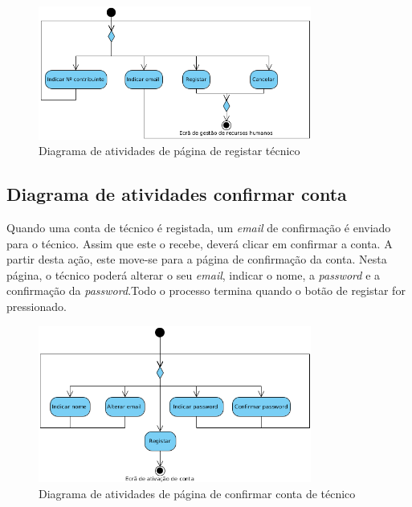 \begin{figure}[htb]
    \centering
    \includegraphics[width=0.8\textwidth]{images/diagramas/atividades/diagrama_atividades_add_professional.png}
    \caption{Diagrama de atividades de página de registar técnico}
    \label{fig:31}
\end{figure}

\subsection{Diagrama de atividades confirmar conta}

Quando uma conta de técnico é registada, um \textit{email} de confirmação é enviado para o técnico. Assim que este o recebe, deverá clicar em confirmar a conta. A partir desta ação, este move-se para a página de confirmação da conta. Nesta página, o técnico poderá alterar o seu \textit{email}, indicar o nome, a \textit{password} e a confirmação da \textit{password}.Todo o processo termina quando o botão de registar for pressionado.

\begin{figure}[htb]
    \centering
    \includegraphics[width=0.8\textwidth]{images/diagramas/atividades/diagrama_atividades_prof_register.png}
    \caption{Diagrama de atividades de página de confirmar conta de técnico}
    \label{fig:31}
\end{figure}